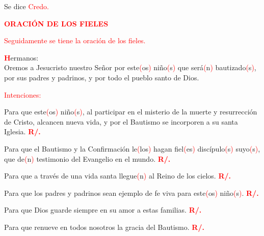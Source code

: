 \documentclass[12pt, letterpaper, spanish]{article}
\begin{document}
  \Large Se dice \textcolor{red}{Credo.}

  \Large {\bfseries \textcolor{red}{ORACI\'ON DE LOS FIELES}} 

  \large {\textcolor{red}{Seguidamente se tiene la oraci\'on de los fieles.}} 

  \lettrine[lines=2]{\bfseries \textcolor{red}{H}}{}\Large ermanos:\\
  Oremos a Jesucristo nuestro Se\~nor por este\textcolor{red}{(}os\textcolor{red}{)} ni\~no\textcolor{red}{(}s\textcolor{red}{)} que ser\'a\textcolor{red}{(}n\textcolor{red}{)} bautizado\textcolor{red}{(}s\textcolor{red}{)}, por sus padres y padrinos, y por todo el pueblo santo de Dios.

  \noindent
  \large {\textcolor{red}{Intenciones:}} 

  \noindent
  \Large {Para que este\textcolor{red}{(}os\textcolor{red}{)} ni\~no\textcolor{red}{(}s\textcolor{red}{)}, al participar en el misterio de la muerte y resurrecci\'on de Cristo, alcancen nueva vida, y por el Bautismo se incorporen a su santa Iglesia.
  \hspace{1cm} \bfseries \textcolor{red}{R/.}}

  \noindent
  \Large {Para que el Bautismo y la Confirmaci\'on le\textcolor{red}{(}los\textcolor{red}{)} hagan fiel\textcolor{red}{(}es\textcolor{red}{)} disc\'ipulo\textcolor{red}{(}s\textcolor{red}{)} suyo\textcolor{red}{(}s\textcolor{red}{)}, que de\textcolor{red}{(}n\textcolor{red}{)} testimonio del Evangelio en el mundo. 
  \hspace{1cm} \bfseries \textcolor{red}{R/.}}

  \noindent
  \Large {Para que a trav\'es de una vida santa llegue\textcolor{red}{(}n\textcolor{red}{)} al Reino de los cielos.
  \hspace{1cm} \bfseries \textcolor{red}{R/.}}

  \noindent
  \Large {Para que los padres y padrinos sean ejemplo de fe viva para este\textcolor{red}{(}os\textcolor{red}{)} ni\~no\textcolor{red}{(}s\textcolor{red}{)}.
  \hspace{1cm} \bfseries \textcolor{red}{R/.}}

  \noindent
  \Large {Para que Dios guarde siempre en su amor a estas familias.
  \hspace{1cm} \bfseries \textcolor{red}{R/.}}

  \noindent
  \Large {Para que renueve en todos nosotros la gracia del Bautismo.
  \hspace{1cm} \bfseries \textcolor{red}{R/.}}
\end{document}

